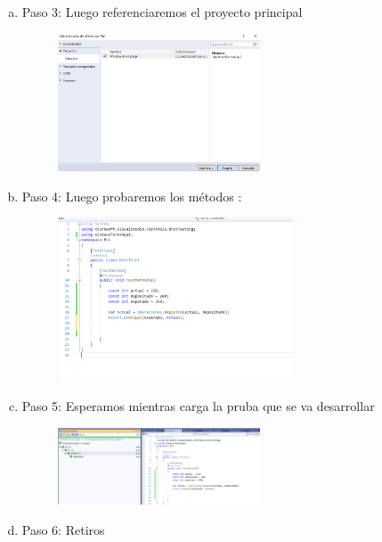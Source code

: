 \begin{enumerate}[1.]
\begin{enumerate}[a)]
\begin{figure}[H]
\begin{center}
		\end{center}
		\end{figure}
	\item Paso 3: Luego referenciaremos el proyecto principal
		\begin{figure}[H]
		\begin{center}
		\includegraphics[width=6cm]{./Imagenes/imp3}
		\end{center}
		\end{figure}
	\item Paso 4: Luego probaremos los métodos :
		\begin{figure}[H]
		\begin{center}
		\includegraphics[width=7cm]{./Imagenes/imp4}
		\end{center}
		\end{figure}
	\item Paso 5: Esperamos mientras carga la pruba que se va desarrollar
		\begin{figure}[H]
		\begin{center}
		\includegraphics[width=6cm]{./Imagenes/imp5}
		\end{center}
		\end{figure}
	\item Paso 6: Retiros
		\begin{figure}[H]
		\begin{center}

\end{center}
\end{figure}
\end{enumerate}
\end{enumerate}
